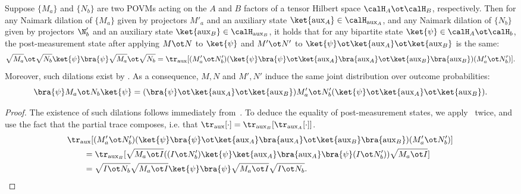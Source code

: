 \documentclass[11pt]{article}
\newcommand{\rmaux}{\mathrm{aux}}
\begin{document}
\begin{corollary}\label{cor:bipartite-naimark}
  Suppose $\{M_a\}$ and $\{N_b\}$ are two POVMs acting on the $A$ and
  $B$ factors of a tensor Hilbert space $\calH_{A} \ot \calH_{B}$,
  respectively. Then for any Naimark dilation of $\{M_a\}$ given by
  projectors $M'_a$ and an auxiliary state $\ket{\rmaux_A} \in
  \calH_{\rmaux_A}$, and any Naimark dilation of $\{N_b\}$ given by
  projectors $\N'_b$ and an auxiliary state
  $\ket{\rmaux_B} \in \calH_{\rmaux_B}$, it holds that for any bipartite state $\ket{\psi} \in
  \calH_{A} \ot \calH_{b}$, the post-measurement state after applying
  $M \ot N$ to $\ket{\psi}$ and $M' \ot N'$ to $\ket{\psi} \ot
  \ket{\rmaux_A} \ot \ket{\rmaux_B}$ is the same:
  \[ \sqrt{M_a} \ot \sqrt{N_b}  \ket{\psi} \bra{\psi}  \sqrt{M_a} \ot
    \sqrt{N_b} = \tr_{\rmaux}[ (M'_a \ot N'_b) (\ket{\psi}\bra{\psi}
    \ot \ket{\rmaux_{A}}\bra{\rmaux_{A}} \ot
    \ket{\rmaux_B}\bra{\rmaux_B} )(M'_a \ot N'_b)]. \]
  Moreover, such dilations exist by .
  As a consequence, $M, N$ and $M', N'$ induce the same joint
  distribution over outcome probabilities:
  \[ \bra{\psi} M_a \ot N_b \ket{\psi} = (\bra{\psi} \ot
    \ket{\rmaux_A} \ot \ket{\rmaux_B}) M'_a \ot N'_b (\ket{\psi} \ot
    \ket{\rmaux_A} \ot \ket{\rmaux_B}). \]
\end{corollary}
\begin{proof}
  The existence of such dilations follows immediately
  from~. To deduce the equality of post-measurement
  states, we apply~ twice, and use the fact that the partial
  trace composes, i.e. that $\tr_{\rmaux}[\cdot] = \tr_{\rmaux_B}[\tr_{\rmaux_A}[\cdot]]$.
  \begin{align*}
    &\tr_{\rmaux}[ (M'_a \ot N'_b) (\ket{\psi}\bra{\psi}
    \ot \ket{\rmaux_{A}}\bra{\rmaux_{A}} \ot
      \ket{\rmaux_B}\bra{\rmaux_B}) (M'_a \ot N'_b)]\\
    &\qquad= \tr_{\rmaux_B}[
                                                    \sqrt{M_a \ot I}
                                                    ((I \ot N'_b) \ket{\psi}
                                                    \ket{\rmaux_A}
                                                    \bra{\rmaux_A}
                                                    \bra{\psi} (I \ot
                                                    N'_b)) \sqrt{M_a
                                                    \ot I}] \\
    &\qquad= \sqrt{I \ot N_b} \sqrt{M_a \ot I} \ket{\psi} \bra{\psi}
      \sqrt{M_a \ot I} \sqrt{I \ot N_b}.\qedhere 
  \end{align*}
\end{proof}
\end{document}
